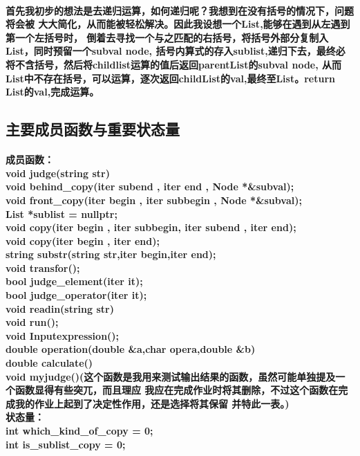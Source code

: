 \documentclass[UTF8]{ctexart}
\begin{document}
\paragraph{\hspace{2em}
首先我初步的想法是去递归运算，如何递归呢？我想到在没有括号的情况下，问题将会被
大大简化，从而能被轻松解决。因此我设想一个List,能够在遇到从左遇到第一个左括号时，
倒着去寻找一个与之匹配的右括号，将括号外部分复制入List，同时预留一个subval node,
括号内算式的存入sublist,递归下去，最终必将不含括号，然后将childlist运算的值后返回parentList的subval node,
从而List中不存在括号，可以运算，逐次返回childList的val,最终至List。return List的val,完成运算。
}
\subsection{主要成员函数与重要状态量}
\paragraph{
    \hspace{2em}成员函数：\\
void judge(string str)\\
void behind\_copy(iter subend , iter end , Node *\&subval);\\
void front\_copy(iter begin , iter subbegin , Node *\&subval);\\
List *sublist = nullptr;\\
void copy(iter begin , iter subbegin, iter subend , iter end);\\
void copy(iter begin , iter end);\\
string substr(string str,iter begin,iter end);\\
void transfor();\\
bool judge\_element(iter it);\\
bool judge\_operator(iter it);\\
void readin(string str) \\
void run();\\
void Inputexpression();\\
double operation(double \&a,char opera,double \&b)\\
double calculate()\\
void myjudge()(这个函数是我用来测试输出结果的函数，虽然可能单独提及一个函数显得有些突兀，而且理应
我应在完成作业时将其删除，不过这个函数在完成我的作业上起到了决定性作用，还是选择将其保留
并特此一表。)\\
\hspace{2em}状态量：\\
int which\_kind\_of\_copy = 0;\\
int is\_sublist\_copy = 0;\\
}
\end{document}
